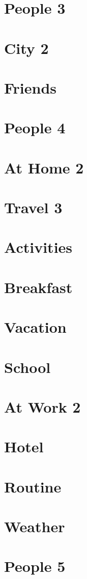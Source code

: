 \documentclass[a4paper,11pt,oneside]{book}
\begin{document}
\section{People 3}
\section{City 2}
\section{Friends}
\section{People 4}
\section{At Home 2}
\section{Travel 3}
\section{Activities}
\section{Breakfast}
\section{Vacation}
\section{School}
\section{At Work 2}
\section{Hotel}
\section{Routine}
\section{Weather}
\section{People 5}
\end{document}
